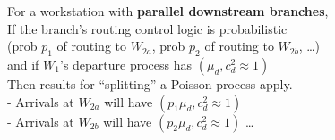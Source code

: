 \documentclass[11pt]{article}
\begin{document}
\vspace{3mm}

\noindent For a workstation with \textbf{parallel downstream branches},\\
\noindent If the branch's routing control logic is probabilistic\\
\noindent (prob $p_1$ of routing to $W_{2a}$, prob $p_2$ of routing to $W_{2b}$, \ldots)\\
\noindent and if $W_1$'s departure process has $(\mu_d, c_d^2 \approx 1)$\\
\noindent Then results for ``splitting'' a Poisson process apply.\\
\noindent - Arrivals at $W_{2a}$ will have $(p_1 \mu_d, c_d^2 \approx 1)$\\
\noindent - Arrivals at $W_{2b}$ will have $(p_2 \mu_d, c_d^2 \approx 1)$ \ldots
\end{document}
